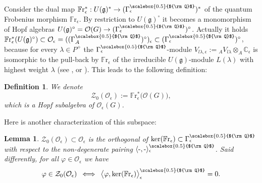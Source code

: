 \documentclass[11pt]{amsart}
\newtheorem{lem}[teo]{Lemma}
\newtheorem{defi}[teo]{Definition}
\newcommand{\e}{\epsilon}
\newcommand{\Oo}{\mathcal{O}}
\newcommand{\Q}{{\scalebox{0.5}{${\rm Q}$}}}
\begin{document}
Consider the dual map $\mathbb{F}\mathrm{r}_\e^{*} :U(\mathfrak{g})^{*}\to (\Gamma_\e^\Q)^{* }$ of the quantum Frobenius morphism $\mathbb{F}\mathrm{r}_\e$. By restriction to $U(\mathfrak{g})^\circ$ it becomes a monomorphism of Hopf algebras $U(\mathfrak{g})^\circ = \mathcal{O}(G) \to (\Gamma_\e^\Q)^\circ$. Actually it holds $\mathbb{F}\mathrm{r}_\e^{*}(U(\mathfrak{g})^{\circ})\subset \Oo_\e = ((\Gamma_A^\Q)^\circ)_\e \subset  (\Gamma_\e^\Q)^{\circ}$, because for every $\lambda\in P^+$ the $\Gamma_\e^\Q$-module $V_{l\lambda,\e}:= {}_AV_{l\lambda} \otimes_A \mathbb{C}_\e$ is isomorphic to the pull-back by $\mathbb{F}\mathrm{r}_\e$ of the irreducible $U(\mathfrak{g})$-module $L(\lambda)$ with highest weight $\lambda$ (see \cite[Prop.\,6.4]{DC-L}, \cite[Prop.\,11.2.11]{CP} or \cite[\S III.7.2]{BG}). This leads to the following definition:
\begin{defi}
We denote
\begin{equation}\label{Z0def}
\mathcal{Z}_0(\mathcal{O}_\e):=\mathbb{F}\mathrm{r}_\e^{*}\bigl({\mathcal O}(G)\bigr),
\end{equation}
which is a Hopf subalgebra of $\mathcal{O}_\e(G)$.
\end{defi}
\noindent Here is another characterization of this subspace:
\begin{lem}\label{lemAutreDefZ0}
$\mathcal{Z}_0(\mathcal{O}_\e) \subset \mathcal{O}_\e$ is the orthogonal of $\ker(\mathbb{F}\mathrm{r}_\e) \subset \Gamma_\e^\Q$ with respect to the non-degenerate pairing $\langle \text{-},\text{-} \rangle^\Q_\e$. Said differently, for all $\varphi \in \mathcal{O}_\e$ we have
\[ \varphi \in \mathcal{Z}_0(\mathcal{O}_\e) \: \iff \: \bigl\langle \varphi,\ker(\mathbb{F}\mathrm{r}_\e) \bigr\rangle^\Q_\e = 0. \]
\end{lem}
\end{document}

